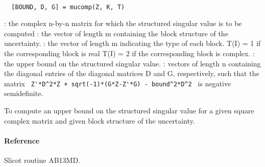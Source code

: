 \begin{mandesc}
   \\ %
\end{mandesc}
\begin{calling_sequence}
\begin{verbatim}
  [BOUND, D, G] = mucomp(Z, K, T)  
\end{verbatim}
\end{calling_sequence}
\begin{parameters}
  \begin{varlist}
    : the complex n-by-n matrix for which the structured singular value is to be computed
    : the vector of length m containing the block structure of the uncertainty.
    : the vector of length m indicating the type of each block. T(I) = 1 if the corresponding block is real T(I) = 2 if the corresponding block is complex.
    : the upper bound on the structured singular value.
    : vectors of length n containing the diagonal entries of the diagonal matrices D and G, respectively, 
    such that the matrix \verb! Z'*D^2*Z + sqrt(-1)*(G*Z-Z'*G) - bound^2*D^2 ! is negative semidefinite.
  \end{varlist}
\end{parameters}
\begin{mandescription}
  To compute an upper bound on the structured singular value for a given square complex matrix and given block structure of the uncertainty.
\end{mandescription}
\paragraph{Reference}
Slicot routine AB13MD.
